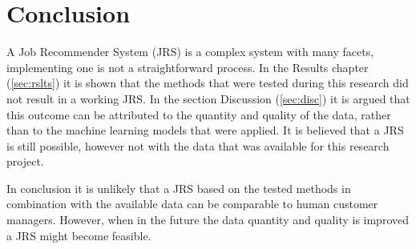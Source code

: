 \section{Conclusion}
\label{sec:concl}

A Job Recommender System (JRS) is a complex system with many facets, implementing one is not a straightforward process.
In the Results chapter (\ref{sec:rslts}) it is shown that the methods that were tested during this research did not result in a working JRS.
In the section Discussion (\ref{sec:disc}) it is argued that this outcome can be attributed to the quantity and quality of the data, rather than to the machine learning models that were applied.
It is believed that a JRS is still possible, however not with the data that was available for this research project.

In conclusion it is unlikely that a JRS based on the tested methods in combination with the available data can be comparable to human customer managers.
However, when in the future the data quantity and quality is improved a JRS might become feasible.